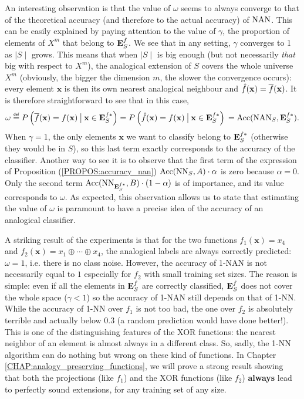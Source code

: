 An interesting observation is that the value of $\omega$ seems to always
converge to that of the theoretical accuracy (and therefore to the actual
accuracy) of $\mbox{NAN}$. This can be easily explained by paying attention to the
value of $\gamma$, the proportion of elements of $X^m$ that belong to $\mathbf{E}_{S}^{f}$.
We see that in any setting, $\gamma$ converges to 1 as $\mid S \mid$ grows.
This means that when $\mid S \mid$ is big enough (but not necessarily
\textit{that} big with respect to $X^m$), the analogical extension of $S$
covers the whole universe $X^m$ (obviously, the bigger the dimension $m$, the
slower the convergence occurs): every element $\mathbf{x}$ is then its own
nearest analogical neighbour and $\hat{f}(\mathbf{x}) = \overline{f}(\mathbf{x})$. It
is therefore straightforward to see that in this case,
$$
  \omega \eqdef P\left(\albl{\mathbf{x}} = f(\mathbf{x}) \given[\big]
  \mathbf{x} \in \esfs\right) = P\left(\hat{f}(\mathbf{x}) = f(\mathbf{x})
  \given[\big] \mathbf{x} \in \esfs\right)\\ = \acc(\NAN_S, \esfs).
$$
When $\gamma = 1$, the only elements $\mathbf{x}$ we want to classify belong to
$\mathbf{E}_{S}^{f*}$ (otherwise they would be in $S$), so this last term exactly corresponds
to the accuracy of the classifier. Another way to see it is to observe that the
first term of the expression of Proposition (\ref{PROPOS:accuracy_nan})
$\mbox{Acc}(\text{NN}_{S}, A) \cdot \alpha$ is zero
because $\alpha = 0$. Only the second term $\mbox{Acc}(\text{NN}_{\mathbf{E}_{S}^{f*}}, B) \cdot (1 -
\alpha)$ is of importance, and its value corresponds to $\omega$. As expected,
this observation allows us to state that estimating the value of $\omega$ is
paramount to have a precise idea of the accuracy of an analogical classifier.

A striking result of the experiments is that for the two functions
$f_1(\mathbf{x}) = x_4$ and $f_2(\mathbf{x}) = x_1 \oplus \cdots \oplus x_4$,
the analogical labels are always correctly predicted: $\omega = 1$, i.e. there
is no class noise. However, the accuracy of 1-NAN is not necessarily equal to
$1$ especially for $f_2$ with small training set sizes. The reason is simple:
even if all the elements in $\mathbf{E}_{S}^{f}$ are correctly classified, $\mathbf{E}_{S}^{f}$ does not
cover the whole space ($\gamma < 1$) so the accuracy of 1-NAN still depends on
that of 1-NN. While the accuracy of 1-NN over $f_1$ is not too bad, the one
over $f_2$ is absolutely terrible and actually below $0.3$ (a random prediction
would have done better!). This is one of the distinguishing features of the XOR
functions: the nearest neighbor of an element is almost always in a different
class. So, sadly, the 1-NN algorithm can do nothing but wrong on these kind of
functions. In Chapter \ref{CHAP:analogy_preserving_functions}, we will prove a
strong result showing that both the projections (like $f_1$) and the XOR
functions (like $f_2$) \textbf{always} lead to perfectly sound extensions, for
any training set of any size.

